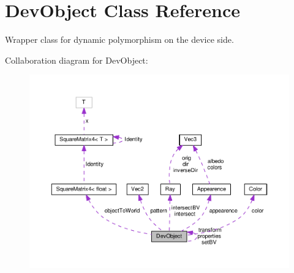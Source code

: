 \hypertarget{class_dev_object}{}\section{Dev\+Object Class Reference}
\label{class_dev_object}


Wrapper class for dynamic polymorphism on the device side.  




Collaboration diagram for Dev\+Object\+:
\nopagebreak
\begin{figure}[H]
\begin{center}
\leavevmode
\includegraphics[width=350pt]{class_dev_object__coll__graph}
\end{center}
\end{figure}
